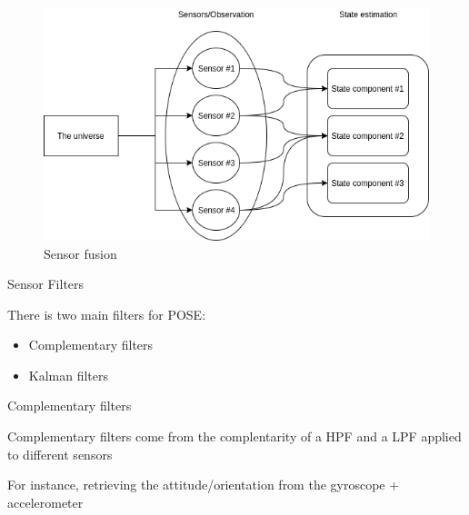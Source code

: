 \begin{frame}{}

\begin{figure}
\centering
\includegraphics{fusion.png}
\caption{Sensor fusion}
\end{figure}

\end{frame}

\begin{frame}{Sensor Filters}

There is two main filters for POSE:

\begin{itemize}
\tightlist
\item
  Complementary filters
\item
  Kalman filters
\end{itemize}

\end{frame}

\begin{frame}{Complementary filters}

Complementary filters come from the complentarity of a HPF and a LPF
applied to different sensors

For instance, retrieving the attitude/orientation from the gyroscope +
accelerometer

\end{frame}

